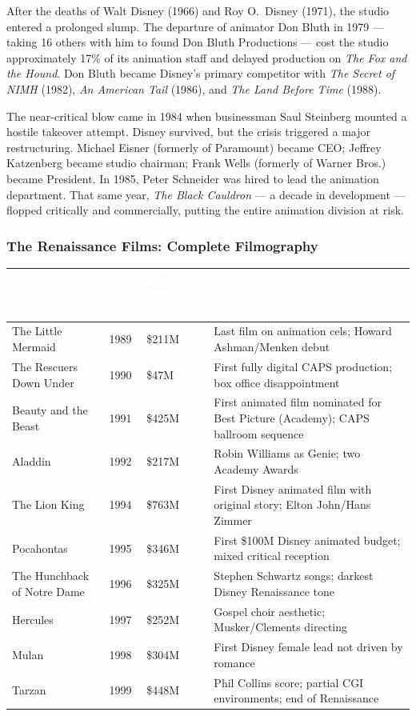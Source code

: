 \documentclass[11pt,letterpaper]{article}
\newcommand{\tableheader}[1]{\textbf{\sffamily\textcolor{white}{#1}}}
\begin{document}
After the deaths of Walt Disney (1966) and Roy O.\ Disney (1971), the studio entered a prolonged slump. The departure of animator Don Bluth in 1979 --- taking 16 others with him to found Don Bluth Productions --- cost the studio approximately 17\% of its animation staff and delayed production on \textit{The Fox and the Hound}. Don Bluth became Disney's primary competitor with \textit{The Secret of NIMH} (1982), \textit{An American Tail} (1986), and \textit{The Land Before Time} (1988).

The near-critical blow came in 1984 when businessman Saul Steinberg mounted a hostile takeover attempt. Disney survived, but the crisis triggered a major restructuring. Michael Eisner (formerly of Paramount) became CEO; Jeffrey Katzenberg became studio chairman; Frank Wells (formerly of Warner Bros.) became President. In 1985, Peter Schneider was hired to lead the animation department. That same year, \textit{The Black Cauldron} --- a decade in development --- flopped critically and commercially, putting the entire animation division at risk.

\subsubsection{The Renaissance Films: Complete Filmography}

\begin{center}
\begin{tabularx}{\textwidth}{L{3.5cm}C{1.2cm}L{3cm}X}
\toprule
{}
\tableheader{Film} & \tableheader{Year} & \tableheader{Box Office (WW)} & \tableheader{Key Innovation / Note} \\
\midrule
The Little Mermaid & 1989 & \$211M & Last film on animation cels; Howard Ashman/Menken debut \\
The Rescuers Down Under & 1990 & \$47M & First fully digital CAPS production; box office disappointment \\
Beauty and the Beast & 1991 & \$425M & First animated film nominated for Best Picture (Academy); CAPS ballroom sequence \\
Aladdin & 1992 & \$217M & Robin Williams as Genie; two Academy Awards \\
The Lion King & 1994 & \$763M & First Disney animated film with original story; Elton John/Hans Zimmer \\
Pocahontas & 1995 & \$346M & First \$100M Disney animated budget; mixed critical reception \\
The Hunchback of Notre Dame & 1996 & \$325M & Stephen Schwartz songs; darkest Disney Renaissance tone \\
Hercules & 1997 & \$252M & Gospel choir aesthetic; Musker/Clements directing \\
Mulan & 1998 & \$304M & First Disney female lead not driven by romance \\
Tarzan & 1999 & \$448M & Phil Collins score; partial CGI environments; end of Renaissance \\
\bottomrule
\end{tabularx}
\end{center}
\end{document}
